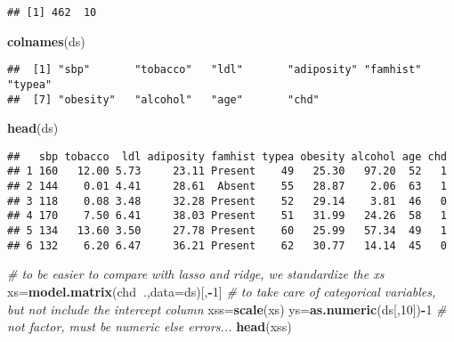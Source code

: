 \documentclass[
]{article}
\newenvironment{Shaded}{\begin{snugshade}}{\end{snugshade}}
\newcommand{\CommentTok}[1]{\textcolor[rgb]{0.56,0.35,0.01}{\textit{#1}}}
\newcommand{\DataTypeTok}[1]{\textcolor[rgb]{0.13,0.29,0.53}{#1}}
\newcommand{\DecValTok}[1]{\textcolor[rgb]{0.00,0.00,0.81}{#1}}
\newcommand{\KeywordTok}[1]{\textcolor[rgb]{0.13,0.29,0.53}{\textbf{#1}}}
\newcommand{\NormalTok}[1]{#1}
\newcommand{\OperatorTok}[1]{\textcolor[rgb]{0.81,0.36,0.00}{\textbf{#1}}}
\begin{document}
\begin{verbatim}
## [1] 462  10
\end{verbatim}

\begin{Shaded}
\begin{Highlighting}[]
\KeywordTok{colnames}\NormalTok{(ds)}
\end{Highlighting}
\end{Shaded}

\begin{verbatim}
##  [1] "sbp"       "tobacco"   "ldl"       "adiposity" "famhist"   "typea"    
##  [7] "obesity"   "alcohol"   "age"       "chd"
\end{verbatim}

\begin{Shaded}
\begin{Highlighting}[]
\KeywordTok{head}\NormalTok{(ds)}
\end{Highlighting}
\end{Shaded}

\begin{verbatim}
##   sbp tobacco  ldl adiposity famhist typea obesity alcohol age chd
## 1 160   12.00 5.73     23.11 Present    49   25.30   97.20  52   1
## 2 144    0.01 4.41     28.61  Absent    55   28.87    2.06  63   1
## 3 118    0.08 3.48     32.28 Present    52   29.14    3.81  46   0
## 4 170    7.50 6.41     38.03 Present    51   31.99   24.26  58   1
## 5 134   13.60 3.50     27.78 Present    60   25.99   57.34  49   1
## 6 132    6.20 6.47     36.21 Present    62   30.77   14.14  45   0
\end{verbatim}

\begin{Shaded}
\begin{Highlighting}[]
\CommentTok{# to be easier to compare with lasso and ridge, we standardize the xs}
\NormalTok{xs=}\KeywordTok{model.matrix}\NormalTok{(chd}\OperatorTok{~}\NormalTok{.,}\DataTypeTok{data=}\NormalTok{ds)[,}\OperatorTok{-}\DecValTok{1}\NormalTok{] }\CommentTok{# to take care of categorical variables, but not include the intercept column}
\NormalTok{xss=}\KeywordTok{scale}\NormalTok{(xs)}
\NormalTok{ys=}\KeywordTok{as.numeric}\NormalTok{(ds[,}\DecValTok{10}\NormalTok{])}\OperatorTok{-}\DecValTok{1} \CommentTok{# not factor, must be numeric else errors...}
\KeywordTok{head}\NormalTok{(xss)}
\end{Highlighting}
\end{Shaded}
\end{document}
